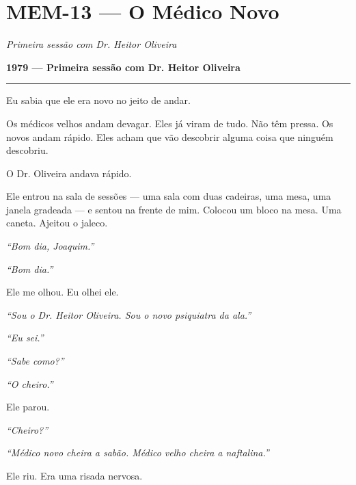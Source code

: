 \section*{\textbf{MEM-13} --- O Médico Novo}

\noindent \textit{Primeira sessão com Dr. Heitor Oliveira}

\noindent \textbf{1979 --- Primeira sessão com Dr. Heitor Oliveira}

\vspace{0.5em}\noindent\rule{\textwidth}{0.5pt}\vspace{0.5em}

\noindent Eu sabia que ele era novo no jeito de andar.

\noindent Os médicos velhos andam devagar. Eles já viram de tudo. Não têm pressa. Os novos andam rápido. Eles acham que vão descobrir alguma coisa que ninguém descobriu.

\noindent O Dr. Oliveira andava rápido.

\noindent Ele entrou na sala de sessões --- uma sala com duas cadeiras, uma mesa, uma janela gradeada --- e sentou na frente de mim. Colocou um bloco na mesa. Uma caneta. Ajeitou o jaleco.

\noindent \textit{\textquotedblleft{}Bom dia, Joaquim.\textquotedblright{}}

\noindent \textit{\textquotedblleft{}Bom dia.\textquotedblright{}}

\noindent Ele me olhou. Eu olhei ele.

\noindent \textit{\textquotedblleft{}Sou o Dr. Heitor Oliveira. Sou o novo psiquiatra da ala.\textquotedblright{}}

\noindent \textit{\textquotedblleft{}Eu sei.\textquotedblright{}}

\noindent \textit{\textquotedblleft{}Sabe como?\textquotedblright{}}

\noindent \textit{\textquotedblleft{}O cheiro.\textquotedblright{}}

\noindent Ele parou.

\noindent \textit{\textquotedblleft{}Cheiro?\textquotedblright{}}

\noindent \textit{\textquotedblleft{}Médico novo cheira a sabão. Médico velho cheira a naftalina.\textquotedblright{}}

\noindent Ele riu. Era uma risada nervosa.

